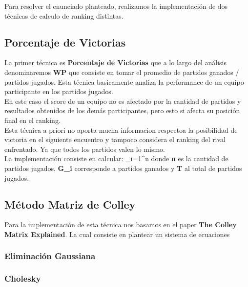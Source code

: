 Para resolver el enunciado planteado, realizamos la implementación de dos técnicas de calculo de ranking distintas. \\

\subsection{Porcentaje de Victorias}

La primer técnica es \textbf{Porcentaje de Victorias} que a lo largo del análisis denominaremos \textbf{WP} que consiste en tomar el promedio de partidos ganados / partidos jugados. Esta técnica basicamente analiza la performance de un equipo participante en los partidos jugados. \\

En este caso el score de un equipo no es afectado por la cantidad de partidos y resultados obtenidos de los demás participantes, pero esto si afecta su posición final en el ranking. \\

Esta técnica a priori no aporta mucha informacion respectoa la posibilidad de victoria en el siguiente encuentro y tampoco considera el ranking del rival enfrentado. Ya que todos los partidos valen lo mismo. \\

La implementación consiste en calcular: \sum_{i=1}^n{}  donde \textbf{n} es la cantidad de partidos jugados, \textbf{G_i} corresponde a partidos ganados y \textbf{T} al total de partidos jugados. \\


\subsection{Método Matriz de Colley}

Para la implementación de esta técnica nos basamos en el paper \textbf{The Colley Matrix Explained}. La cual consiste en plantear un sistema de ecuaciones


\subsubsection{Eliminación Gaussiana}
\subsubsection{Cholesky}



